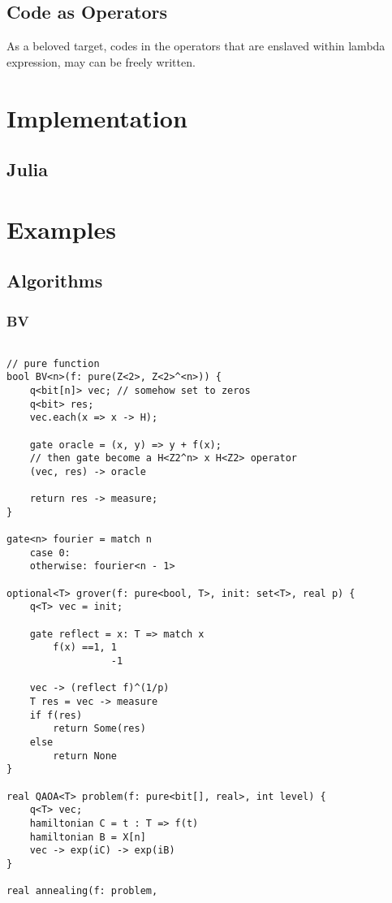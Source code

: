 \documentclass[a4paper,11pt]{article}
\begin{document}
\subsection{Code as Operators}
As a beloved target, codes in the operators that are enslaved within lambda expression, may can be freely written. 

\section{Implementation}
\subsection{Julia}
\section{Examples}
\subsection{Algorithms}
\subsubsection{BV}

\begin{lstlisting}

// pure function
bool BV<n>(f: pure(Z<2>, Z<2>^<n>)) {
    q<bit[n]> vec; // somehow set to zeros
    q<bit> res;
    vec.each(x => x -> H);
    
    gate oracle = (x, y) => y + f(x);
    // then gate become a H<Z2^n> x H<Z2> operator
    (vec, res) -> oracle
    
    return res -> measure; 
}

gate<n> fourier = match n 
    case 0: 
    otherwise: fourier<n - 1>
    
optional<T> grover(f: pure<bool, T>, init: set<T>, real p) {
    q<T> vec = init;
    
    gate reflect = x: T => match x
        f(x) ==1, 1
                  -1
    
    vec -> (reflect f)^(1/p)
    T res = vec -> measure
    if f(res)
        return Some(res)
    else
        return None
}

real QAOA<T> problem(f: pure<bit[], real>, int level) {
    q<T> vec;
    hamiltonian C = t : T => f(t)
    hamiltonian B = X[n]
    vec -> exp(iC) -> exp(iB)
}

real annealing(f: problem, 

\end{lstlisting}
\end{document}
